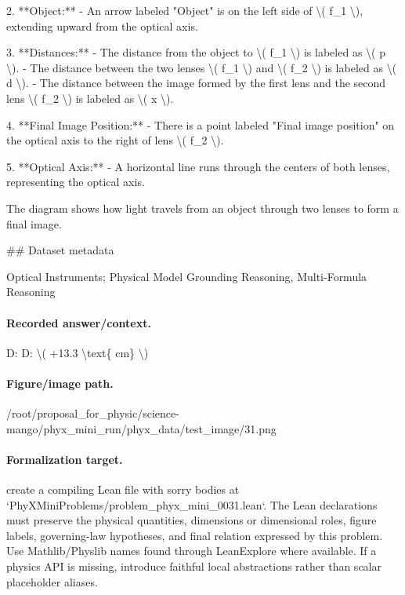 2. **Object:**
   - An arrow labeled "Object" is on the left side of \textbackslash{}( f\_1 \textbackslash{}), extending upward from the optical axis.

3. **Distances:**
   - The distance from the object to \textbackslash{}( f\_1 \textbackslash{}) is labeled as \textbackslash{}( p \textbackslash{}).
   - The distance between the two lenses \textbackslash{}( f\_1 \textbackslash{}) and \textbackslash{}( f\_2 \textbackslash{}) is labeled as \textbackslash{}( d \textbackslash{}).
   - The distance between the image formed by the first lens and the second lens \textbackslash{}( f\_2 \textbackslash{}) is labeled as \textbackslash{}( x \textbackslash{}).

4. **Final Image Position:**
   - There is a point labeled "Final image position" on the optical axis to the right of lens \textbackslash{}( f\_2 \textbackslash{}).

5. **Optical Axis:**
   - A horizontal line runs through the centers of both lenses, representing the optical axis.

The diagram shows how light travels from an object through two lenses to form a final image.

\#\# Dataset metadata

Optical Instruments; Physical Model Grounding Reasoning, Multi-Formula Reasoning

\paragraph{Recorded answer/context.}
D: D: \textbackslash{}( +13.3 \textbackslash{}text\{ cm\} \textbackslash{})

\paragraph{Figure/image path.}
/root/proposal\_for\_physic/science-mango/phyx\_mini\_run/phyx\_data/test\_image/31.png

\paragraph{Formalization target.}
create a compiling Lean file with sorry bodies at `PhyXMiniProblems/problem\_phyx\_mini\_0031.lean`. The Lean declarations must preserve the physical quantities, dimensions or dimensional roles, figure labels, governing-law hypotheses, and final relation expressed by this problem.
Use Mathlib/Physlib names found through LeanExplore where available. If a physics API is missing, introduce faithful local abstractions rather than scalar placeholder aliases.


